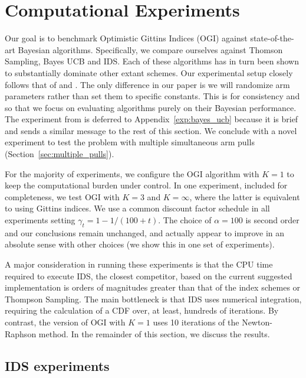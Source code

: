 \section{Computational Experiments} \label{sec:experiments}
Our goal is to benchmark Optimistic Gittins Indices (OGI) against state-of-the-art Bayesian algorithms. Specifically, we compare ourselves against Thomson Sampling, Bayes UCB and IDS. Each of these algorithms has in turn been shown to substantially dominate other extant schemes. Our experimental setup closely follows that of \cite{russo2014learning,kaufmann2012thompson} and \cite{chapelle2011empirical}. The only difference in our paper is we will randomize arm parameters rather than set them to specific constants. This is for consistency and so that we focus on evaluating algorithms purely on their Bayesian performance. The experiment from \cite{kaufmann2012thompson} is deferred to Appendix~\ref{exp:bayes_ucb} because it is brief and sends a similar message to the rest of this section. We conclude with a novel experiment to test the problem with multiple simultaneous arm pulls (Section~\ref{sec:multiple_pulls}).

For the majority of experiments, we configure the OGI algorithm with $K =1$ to keep the computational burden under control. In one experiment, included for completeness, we test OGI with $K = 3$ and $K=\infty$, where the latter is equivalent to using Gittins indices. We use a common discount factor schedule in all experiments setting $\gamma_t = 1 - 1/(100 + t)$. The choice of $\alpha = 100$ is second order and our conclusions remain unchanged, and actually appear to improve in an absolute sense with other choices (we show this in one set of experiments). 

A major consideration in running these experiments is that the CPU time required to execute IDS, the closest competitor, based on the current suggested implementation is orders of magnitudes greater than that of the index schemes or Thompson Sampling. The main bottleneck is that IDS uses numerical integration,  requiring the calculation of a CDF over, at least, hundreds of iterations. By contrast, the version of OGI with $K=1$ uses 10 iterations of the Newton-Raphson method. In the remainder of this section, we discuss the results.

\subsection{IDS experiments}

